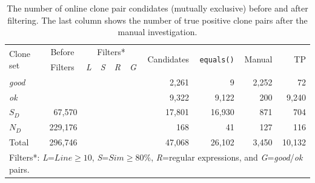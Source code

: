 \documentclass{sig-alternate-05-2015}
\begin{document}
\begin{table}
	\centering
	\caption{The number of online clone pair condidates (mutually exclusive) before and after filtering. The last column shows the number of true positive clone pairs after the manual investigation. }
	\label{tab:online_clone_pairs}
	\small
	\begin{tabular}{l|r|c|c|c|c|r|r|r|r}
		\hline
		\multirow{2}{*}{Clone set} & \multicolumn{1}{c|}{Before} & \multicolumn{4}{c|}{Filters*} & \multirow{2}{*}{Candidates} & \multirow{2}{*}{\texttt{equals()}} & \multirow{2}{*}{Manual} & \multirow{2}{*}{TP} \\ \cline{3-6}
		        		  & \multicolumn{1}{c|}{Filters} & \textit{L} & \textit{S} & \textit{R} & \textit{G} & & & & \\
		\hline 
		\multirow{1}{*}{\textit{good}} & & & & & & 2,261 & 9 & 2,252 & 72 \\
		\multirow{1}{*}{\textit{ok}} &  & & & & & 9,322 & 9,122 & 200 & 9,240 \\
		\multirow{1}{*}{$S_D$} & 67,570 & \checkmark & & \checkmark & \checkmark & 17,801 & 16,930 & 871 & 704 \\
		\multirow{1}{*}{$N_D$} & 229,176 & & \checkmark & \checkmark & \checkmark & 168 & 41 & 127 & 116 \\ 
		\hline
		Total  & 296,746 & & & & & 47,068 & 26,102 & 3,450 & 10,132 \\ 
		\hline
	 	\multicolumn{10}{l}{\scriptsize{Filters*: \textit{L}=$Line \geq 10$, \textit{S}=$Sim \geq 80\%$, \textit{R}=regular expressions, and \textit{G}=\textit{good}/\textit{ok} pairs.}}
	\end{tabular} 
\end{table}
\end{document}
